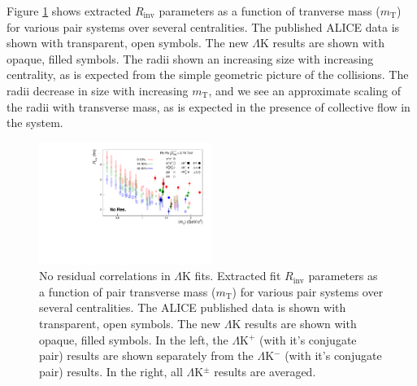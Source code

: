\documentclass[/home/jesse/Analysis/FemtoAnalysis/AnalysisNotes/AnalysisNoteJBuxton.tex]{subfiles}
\begin{document}
Figure \ref{fig:mTScalingOfRadii_NoRes} shows extracted $R_{\mathrm{inv}}$ parameters as a function of tranverse mass ($m_{\mathrm{T}}$) for various pair systems over several centralities.  The published ALICE data \cite{Adam:2015vja} is shown with transparent, open symbols.  The new $\Lambda$K results are shown with opaque, filled symbols.  The radii shown an increasing size with increasing centrality, as is expected from the simple geometric picture of the collisions.  The radii decrease in size with increasing $m_{\mathrm{T}}$, and we see an approximate scaling of the radii with transverse mass, as is expected in the presence of collective flow in the system.

\begin{figure}[h]
  \centering
  \includegraphics[width=0.50\textwidth]{7_ResultsAndDiscussion/Figures/mTscaling_MinvCalc_OutlinedPoints_OthersTransparent_wJaiAndHans_NoRes.pdf}
  \caption[$m_{\mathrm{T}}$ Scaling of Radii: No Residuals in Fit]{No residual correlations in $\Lambda$K fits.  Extracted fit $R_{\mathrm{inv}}$ parameters as a function of pair transverse mass ($m_{\mathrm{T}}$) for various pair systems over several centralities. The ALICE published data \cite{Adam:2015vja} is shown with transparent, open symbols.  The new $\Lambda$K results are shown with opaque, filled symbols.  In the left, the $\Lambda$K$^{+}$ (with it's conjugate pair) results are shown separately from the $\Lambda$K$^{-}$ (with it's conjugate pair) results.  In the right, all $\Lambda$K$^{\pm}$ results are averaged.}
  \label{fig:mTScalingOfRadii_NoRes}
\end{figure}
\end{document}
